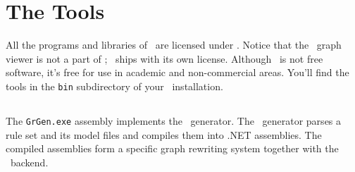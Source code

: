 \section{The Tools}

All the programs and libraries of \GrG\ are licensed under . 
Notice that the \yComp\ graph viewer is not a part of \GrG ; \yComp\ ships with its own license. 
Although \yComp\ is not free software, it's free for use in academic and non-commercial areas.
You'll find the tools in the \texttt{bin} subdirectory of your \GrG\ installation.


\subsection{\texttt{}}

\noindent The \texttt{GrGen.exe} assembly implements the \GrG\ generator. 
The \GrG\ generator parses a rule set and its model files and compiles them into .NET assemblies.
The compiled assemblies form a specific graph rewriting system together with the \GrG\ backend.

